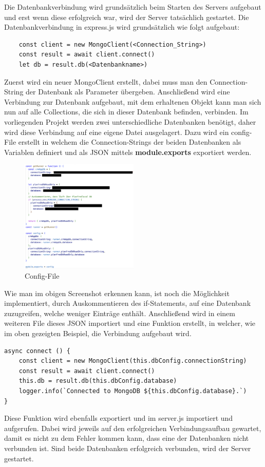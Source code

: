 Die Datenbankverbindung wird grundsätzlich beim Starten des Servers aufgebaut und erst wenn diese erfolgreich war, wird der Server tatsächlich gestartet. Die Datenbankverbindung in express.js wird grundsätzlich wie folgt aufgebaut:
\newline
\begin{lstlisting}
    const client = new MongoClient(<Connection_String>)
    const result = await client.connect()
    let db = result.db(<Datenbankname>)
\end{lstlisting}
Zuerst wird ein neuer MongoClient erstellt, dabei muss man den Connection-String der Datenbank als Parameter übergeben. Anschließend wird eine Verbindung zur Datenbank aufgebaut, mit dem erhaltenen Objekt kann man sich nun auf alle Collections, die sich in dieser Datenbank befinden, verbinden. Im vorliegenden Projekt werden zwei unterschiedliche Datenbanken benötigt, daher wird diese Verbindung auf eine eigene Datei ausgelagert.
\newline
Dazu wird ein config-File erstellt in welchem die Connection-Strings der beiden Datenbanken als Variablen definiert und als JSON mittels \textbf{module.exports} exportiert werden.
\begin{figure}[h!]
    \centering
    \includegraphics[width=0.5\textwidth]{pics/config-file-conn-strings.png}
    \caption{Config-File}
    \label{fig:enter-label}
\end{figure}
Wie man im obigen Screenshot erkennen kann, ist noch die Möglichkeit implementiert, durch Auskommentieren des if-Statements, auf eine Datenbank zuzugreifen, welche weniger Einträge enthält.
\newline
Anschließend wird in einem weiteren File dieses JSON importiert und eine Funktion erstellt, in welcher, wie im oben gezeigten Beispiel, die Verbindung aufgebaut wird.
\begin{lstlisting}
async connect () {
    const client = new MongoClient(this.dbConfig.connectionString)
    const result = await client.connect()
    this.db = result.db(this.dbConfig.database)
    logger.info(`Connected to MongoDB ${this.dbConfig.database}.`)
}
\end{lstlisting}
Diese Funktion wird ebenfalls exportiert und im server.js importiert und aufgerufen. Dabei wird jeweils auf den erfolgreichen Verbindungsaufbau gewartet, damit es nicht zu dem Fehler kommen kann, dass eine der Datenbanken nicht verbunden ist. Sind beide Datenbanken erfolgreich verbunden, wird der Server gestartet.